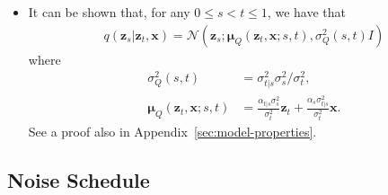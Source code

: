 \documentclass[10pt]{article}
\newcommand{\ve}[1]{\mathbf{#1}}
\newcommand{\ves}[1]{\boldsymbol{#1}}
\newcommand{\N}{\mathcal{N}}
\begin{document}
\begin{itemize}
  \item It can be shown that, for any $0 \leq s < t \leq 1$, we have that
  \begin{align*}
    q(\ve{z}_s|\ve{z}_t, \ve{x}) = \N(\ve{z}_s; \ves{\mu}_Q(\ve{z}_t, \ve{x}; s, t), \sigma^2_Q(s,t) I )
  \end{align*}
  where
  \begin{align*}
    \sigma_Q^{2}(s,t) & = \sigma_{t|s}^2 \sigma_s^2 / \sigma_t^2, \\
    \ves{\mu}_Q(\ve{z}_t, \ve{x}; s, t) &= \frac{\alpha_{t|s}\sigma_s^2}{\sigma_t^2} \ve{z}_t + \frac{\alpha_s \sigma_{t|s}^2}{\sigma_t^2} \ve{x}.
  \end{align*}
  See a proof also in Appendix~\ref{sec:model-properties}.
\end{itemize}

\subsection{Noise Schedule}
\end{document}
